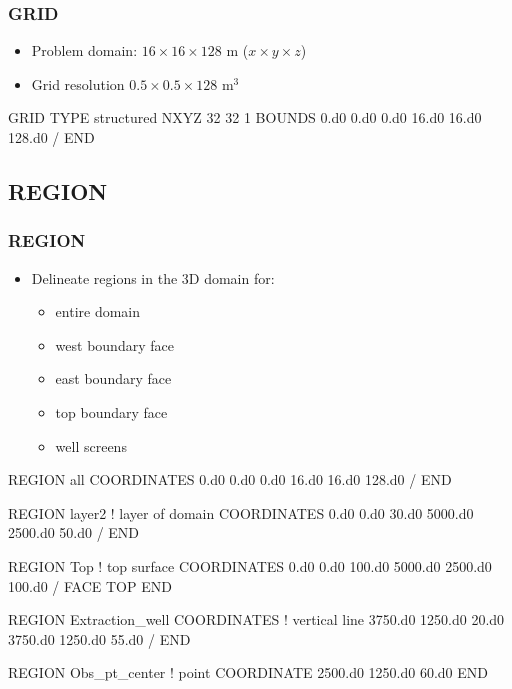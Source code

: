 \documentclass{beamer}
\newcommand\bluecomment[1]{{{\color{blue} #1}}}
\newcommand\magentacomment[1]{{{\color{magenta} #1}}}
\begin{document}
\begin{frame}\frametitle{\bf GRID}

\begin{itemize}
  \item Problem domain: $16 \times 16 \times 128$ m ($x \times y \times z$)
  \item Grid resolution $0.5 \times 0.5 \times 128$ m$^3$
\end{itemize}

\begin{semiverbatim}
GRID
  TYPE structured
  NXYZ 32 32 1
  BOUNDS
    0.d0 0.d0 0.d0
    16.d0 16.d0 128.d0
  /
END
\end{semiverbatim}

\end{frame}

\subsection{REGION}

\begin{frame}\frametitle{REGION}

\begin{itemize}
  \item Delineate regions in the 3D domain for:
  \begin{itemize}
    \item entire domain
    \item west boundary face
    \item east boundary face
    \item top boundary face
    \item well screens
  \end{itemize}
\end{itemize}

\begin{semiverbatim}
REGION all
  COORDINATES
    0.d0 0.d0 0.d0
    16.d0 16.d0 128.d0
  /
END

\newpage
REGION layer2        \bluecomment{! layer of domain}
  COORDINATES
    0.d0 0.d0 30.d0
    5000.d0 2500.d0 50.d0
  /
END

REGION Top           \bluecomment{! top surface}
  COORDINATES
    0.d0 0.d0 100.d0
    5000.d0 2500.d0 100.d0
  /
  FACE TOP
END

\newpage
REGION Extraction_well
  COORDINATES             \bluecomment{! vertical line}
    3750.d0 1250.d0 20.d0
    3750.d0 1250.d0 55.d0
  /
END

REGION Obs_pt_center      \bluecomment{! point}
  \magentacomment{COORDINATE} 2500.d0 1250.d0 60.d0
END

\end{semiverbatim}

\end{frame}
\end{document}
